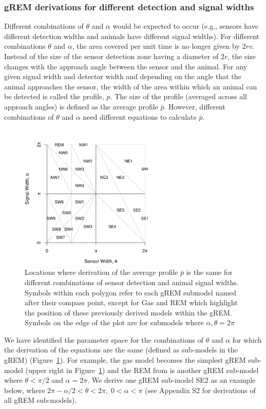 \documentclass[a4paper,10pt,reqno,oneside]{amsart}
\begin{document}
\subsubsection*{gREM derivations for different detection and signal widths}
Different combinations of $\theta$ and $\alpha$ would be expected to occur (e.g., sensors have different detection widths and animals have different signal widths). For different combinations $\theta$ and $\alpha$, the area covered per unit time is no longer given by $2rv$. Instead of the size of the sensor detection zone having a diameter of $2r$, the size changes with the approach angle between the sensor and the animal. For any given signal width and detector width and depending on the angle that the animal approaches the sensor, the width of the area within which an animal can be detected is called the profile, $p$. The size of the profile (averaged across all approach angles) is defined as the average profile $\bar{p}$. However, different combinations of $\theta$ and $\alpha$ need different equations to calculate $\bar{p}$. 

\begin{figure}
\centering
\includegraphics[width=7cm]{imgs/equalRegions.pdf}
\caption{Locations where derivation of the average profile $\bar{p}$ is the same for different combinations of sensor detection and animal signal widths. Symbols within each polygon refer to each gREM submodel named after their compass point, except for Gas and REM which highlight the position of these previously derived models within the gREM. Symbols on the edge of the plot are for submodels where $\alpha, \theta = 2\pi$}
\label{f:equalRegions}
\end{figure}

We have identified the parameter space for the combinations of $\theta$ and $\alpha$ for which the derivation of the equations are the same (defined as sub-models in the gREM) (Figure~\ref{f:equalRegions}). For example, the gas model becomes the simplest gREM sub-model (upper right in Figure~\ref{f:equalRegions}) and the REM from \citet{rowcliffe2008estimating} is another gREM sub-model where $\theta<\pi/2$ and $\alpha = 2\pi$. We derive one gREM sub-model SE2 as an example below, where $2 \pi - \alpha/2 < \theta < 2\pi ,\; 0 < \alpha <\pi$ (see Appendix S2 for derivations of all gREM sub-models).
\end{document}
